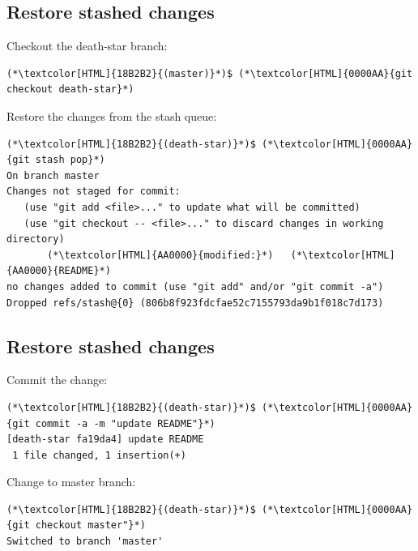 \subsection{Restore stashed changes}
\begin{frame}[fragile]
  \subslidetitle

  Checkout the death-star branch:
  \begin{lstlisting}
(*\textcolor[HTML]{18B2B2}{(master)}*)$ (*\textcolor[HTML]{0000AA}{git checkout death-star}*)
\end{lstlisting}
  Restore the changes from the stash queue:

  \begin{lstlisting}
(*\textcolor[HTML]{18B2B2}{(death-star)}*)$ (*\textcolor[HTML]{0000AA}{git stash pop}*)
On branch master
Changes not staged for commit:
   (use "git add <file>..." to update what will be committed)
   (use "git checkout -- <file>..." to discard changes in working directory)
       (*\textcolor[HTML]{AA0000}{modified:}*)   (*\textcolor[HTML]{AA0000}{README}*)
no changes added to commit (use "git add" and/or "git commit -a")
Dropped refs/stash@{0} (806b8f923fdcfae52c7155793da9b1f018c7d173)
\end{lstlisting}
\end{frame}

\subsection{Restore stashed changes}
\begin{frame}[fragile]
  \subslidetitle

  Commit the change:
  \begin{lstlisting}
(*\textcolor[HTML]{18B2B2}{(death-star)}*)$ (*\textcolor[HTML]{0000AA}{git commit -a -m "update README"}*)
[death-star fa19da4] update README
 1 file changed, 1 insertion(+)
\end{lstlisting}

  Change to master branch:

  \begin{lstlisting}
(*\textcolor[HTML]{18B2B2}{(death-star)}*)$ (*\textcolor[HTML]{0000AA}{git checkout master"}*)
Switched to branch 'master'
\end{lstlisting}

\end{frame}

